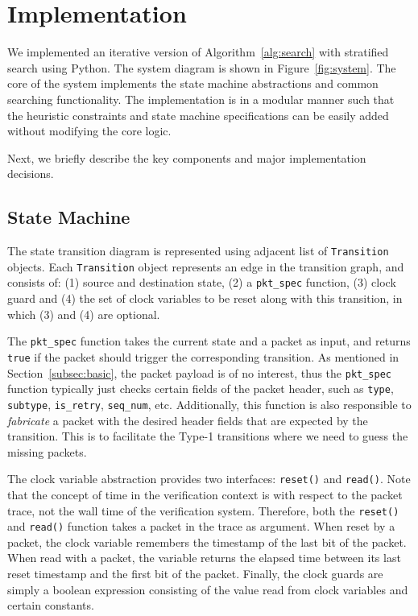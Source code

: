 \section{Implementation}
\label{sec:impl}

We implemented an iterative version of Algorithm~\ref{alg:search} with
stratified search using Python. The system diagram is shown in
Figure~\ref{fig:system}. The core of the system implements the state machine
abstractions and common searching functionality. The implementation is in a
modular manner such that the heuristic constraints and state machine
specifications can be easily added without modifying the core logic.



Next, we briefly describe the key components and major implementation decisions.

\subsection{State Machine}

The state transition diagram is represented using adjacent list of
\texttt{Transition} objects. Each \texttt{Transition} object represents an edge
in the transition graph, and consists of: (1) source and destination state, (2)
a \texttt{pkt\_spec} function, (3) clock guard and (4) the set of clock
variables to be reset along with this transition, in which (3) and (4) are
optional.

The \texttt{pkt\_spec} function takes the current state and  a packet as input,
and returns \texttt{true} if the packet should trigger the corresponding
transition. As mentioned in Section~\ref{subsec:basic}, the packet payload is
of no interest, thus the \texttt{pkt\_spec} function typically just 
checks certain fields of the packet header, such as \texttt{type},
\texttt{subtype}, \texttt{is\_retry}, \texttt{seq\_num}, etc.  Additionally,
this function is also responsible to \textit{fabricate} a packet with the
desired header fields that are expected by the transition. This is to
facilitate the Type-1 transitions where we need to guess the missing packets.

The clock variable abstraction provides two interfaces: \texttt{reset()} and
\texttt{read()}. Note that the concept of time in the verification context is
with respect to the packet trace, not the wall time of the verification system.
Therefore, both the \texttt{reset()} and \texttt{read()} function takes a packet in
the trace as argument. When reset by a packet, the clock variable remembers the
timestamp of the last bit of the packet. When read with a packet, the variable
returns the elapsed time between its last reset timestamp and the first bit of
the packet. Finally, the clock guards are simply a boolean expression consisting
of the value read from clock variables and certain constants.

